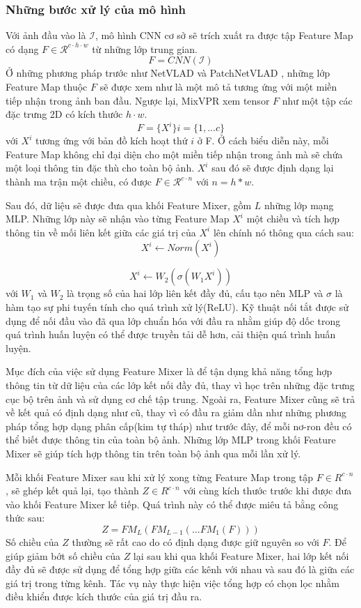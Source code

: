 \subsubsection*{Những bước xử lý của mô hình}
Với ảnh đầu vào là $\mathcal{I}$, mô hình CNN cơ sở sẽ trích xuất ra được tập Feature Map có dạng $F \in \mathcal{R}^{c \cdot h \cdot w}$ từ những lớp trung gian.
$$
F = CNN(\mathcal{I})
$$
Ở những phương pháp trước như NetVLAD \cite{arandjelović2016netvlad} và PatchNetVLAD \cite{hausler2021patchnetvlad}, những lớp Feature Map thuộc $F$ sẽ được xem như là một mô tả tương ứng với một miền tiếp nhận trong ảnh ban đầu. Ngược lại, MixVPR xem tensor $F$ như một tập các đặc trưng 2D có kích thước $h \cdot w$.
$$
F = \{X^{i}\}    i = \{1,...c\}
$$
với $X^{i}$ tương ứng với bản đồ kích hoạt thứ $i$ ở F. Ở cách biểu diễn này, mỗi Feature Map không chỉ đại diện cho một miền tiếp nhận trong ảnh mà sẽ chứa một loại thông tin đặc thù cho toàn bộ ảnh. $X^{i}$ sau đó sẽ được định dạng lại thành ma trận một chiều, có được $F \in \mathcal{R}^{c \cdot n}$ với $n = h*w$.

Sau đó, dữ liệu sẽ được đưa qua khối Feature Mixer, gồm $L$ những lớp mạng MLP. Những lớp này sẽ nhận vào từng Feature Map $X^{i}$ một chiều và tích hợp thông tin về mối liên kết giữa các giá trị của $X^{i}$ lên chính nó thông qua cách sau:
$$
X^{i} \leftarrow Norm(X^{i})
$$

$$
X^{i} \leftarrow W_2(\sigma(W_1 X^{i}))
$$
với $W_1$ và $W_2$ là trọng số của hai lớp liên kết đầy đủ, cấu tạo nên MLP và $\sigma$ là hàm tạo sự phi tuyến tính cho quá trình xử lý(ReLU). Kỹ thuật nối tắt được sử dụng để nối đầu vào đã qua lớp chuẩn hóa với đầu ra nhằm giúp độ dốc trong quá trình huấn luyện có thể được truyền tải dễ hơn, cải thiện quá trình huấn luyện.

Mục đích của việc sử dụng Feature Mixer là để tận dụng khả năng tổng hợp thông tin từ dữ liệu của các lớp kết nối đầy đủ, thay vì học trên những đặc trưng cục bộ trên ảnh và sử dụng cơ chế tập trung. Ngoài ra, Feature Mixer cũng sẽ trả về kết quả có định dạng như cũ, thay vì có đầu ra giảm dần như những phương pháp tổng hợp dạng phân cấp(kim tự tháp) như trước đây, để mỗi nơ-ron đều có thể biết được thông tin của toàn bộ ảnh. Những lớp MLP trong khối Feature Mixer sẽ giúp tích hợp thông tin trên toàn bộ ảnh qua mỗi lần xử lý.

Mỗi khối Feature Mixer sau khi xử lý xong từng Feature Map trong tập $F \in R^{c \cdot n}$, sẽ ghép kết quả lại, tạo thành $Z \in R^{c \cdot n}$ với cùng kích thước trước khi được đưa vào khối Feature Mixer kế tiếp. Quá trình này có thể được miêu tả bằng công thức sau:
$$
Z = FM_L(FM_{L-1}(\dots FM_1(F)))
$$
Số chiều của $Z$ thường sẽ rất cao do có định dạng được giữ nguyên so với $F$. Để giúp giảm bớt số chiều của $Z$ lại sau khi qua khối Feature Mixer, hai lớp kết nối đầy đủ sẽ được sử dụng để tổng hợp giữa các kênh với nhau và sau đó là giữa các giá trị trong từng kênh. Tác vụ này thực hiện việc tổng hợp có chọn lọc nhằm điều khiển được kích thước của giá trị đầu ra.

